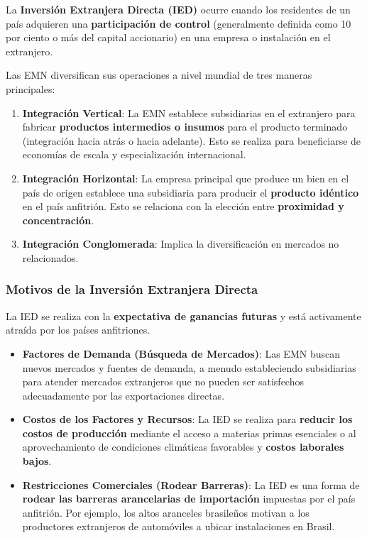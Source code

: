 \begin{definicion}
La \textbf{Inversión Extranjera Directa (IED)} ocurre cuando los residentes de un país adquieren una \textbf{participación de control} (generalmente definida como 10 por ciento o más del capital accionario) en una empresa o instalación en el extranjero.
\end{definicion}

Las EMN diversifican sus operaciones a nivel mundial de tres maneras principales:
\begin{enumerate}
    \item \textbf{Integración Vertical}: La EMN establece subsidiarias en el extranjero para fabricar \textbf{productos intermedios o insumos} para el producto terminado (integración hacia atrás o hacia adelante). Esto se realiza para beneficiarse de economías de escala y especialización internacional.
    \item \textbf{Integración Horizontal}: La empresa principal que produce un bien en el país de origen establece una subsidiaria para producir el \textbf{producto idéntico} en el país anfitrión. Esto se relaciona con la elección entre \textbf{proximidad y concentración}.
    \item \textbf{Integración Conglomerada}: Implica la diversificación en mercados no relacionados.
\end{enumerate}

\subsubsection{Motivos de la Inversión Extranjera Directa}

La IED se realiza con la \textbf{expectativa de ganancias futuras} y está activamente atraída por los países anfitriones.

\begin{itemize}
    \item \textbf{Factores de Demanda (Búsqueda de Mercados)}: Las EMN buscan nuevos mercados y fuentes de demanda, a menudo estableciendo subsidiarias para atender mercados extranjeros que no pueden ser satisfechos adecuadamente por las exportaciones directas.
    \item \textbf{Costos de los Factores y Recursos}: La IED se realiza para \textbf{reducir los costos de producción} mediante el acceso a materias primas esenciales o al aprovechamiento de condiciones climáticas favorables y \textbf{costos laborales bajos}.
    \item \textbf{Restricciones Comerciales (Rodear Barreras)}: La IED es una forma de \textbf{rodear las barreras arancelarias de importación} impuestas por el país anfitrión. Por ejemplo, los altos aranceles brasileños motivan a los productores extranjeros de automóviles a ubicar instalaciones en Brasil.
\end{itemize}

